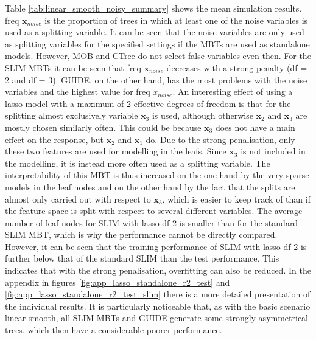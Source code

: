 Table \ref{tab:linear_smooth_noisy_summary} shows the mean simulation results. freq $ \textbf{x}_{noise}$ is the proportion of trees in which at least one of the noise variables is used as a splitting variable. 
It can be seen that the noise variables are only used as splitting variables for the specified settings if the MBTs are used as standalone models. However, MOB and CTree do not select false variables even then. For the SLIM MBTs it can be seen that freq $\textbf{x}_{noise}$ decreases with a strong penalty (df = 2 and df = 3). GUIDE, on the other hand, has the most problems with the noise variables and the highest value for freq $x_{noise}$.
An interesting effect of using a lasso model with a maximum of 2 effective degrees of freedom is that for the splitting almost exclusively variable $\textbf{x}_3$ is used, although otherwise $\textbf{x}_2$ and $\textbf{x}_3$ are mostly chosen similarly often. This could be because $\textbf{x}_3$ does not have a main effect on the response, but $\textbf{x}_2$ and $\textbf{x}_1$ do.  Due to the strong penalisation, only these two features are used for modelling in the leafs. Since $\textbf{x}_3$ is not included in the modelling, it is instead more often used as a splitting variable.
The interpretability of this MBT is thus increased on the one hand by the very sparse models in the leaf nodes and on the other hand by the fact that the splits are almost only carried out with respect to $\textbf{x}_3$, which is easier to keep track of than if the feature space is split with respect to several different variables.
The average number of leaf nodes for SLIM with lasso df 2 is smaller than for the standard SLIM MBT, which is why the performance cannot be directly compared. However, it can be seen that the training performance of SLIM with lasso df 2 is further below that of the standard SLIM than the test performance. This indicates that with the strong penalisation, overfitting can also be reduced.
In the appendix in figures \ref{fig:app_lasso_standalone_r2_test} and \ref{fig:app_lasso_standalone_r2_test_slim} there is a more detailed presentation of the individual results. It is particularly noticeable that, as with the basic scenario linear smooth, all SLIM MBTs and GUIDE generate some strongly asymmetrical trees, which then have a considerable poorer performance.







